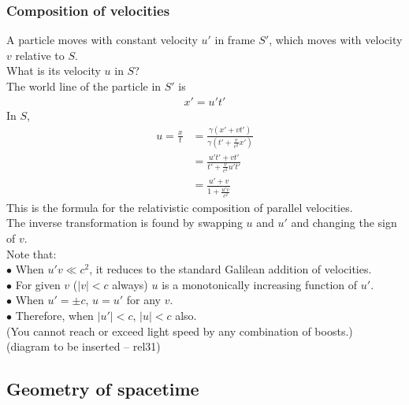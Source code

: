 \documentclass[a4paper]{article}
\begin{document}
\subsubsection{Composition of velocities}
A particle moves with constant velocity $u'$ in frame $S'$, which moves with velocity $v$ relative to $S$.\\
What is its velocity $u$ in $S$?\\
The world line of the particle in $S'$ is
\begin{equation*}
\begin{aligned}
x' = u't'
\end{aligned}
\end{equation*}
In $S$,
\begin{equation*}
\begin{aligned}
u=\frac{x}{t}&=\frac{\gamma\left(x'+vt'\right)}{\gamma\left(t'+\frac{v}{c^2}x'\right)}\\
&=\frac{u't'+vt'}{t'+\frac{v}{c^2}u't'}\\
&=\frac{u'+v}{1+\frac{u'v}{c^2}}
\end{aligned}
\end{equation*}
This is the formula for the relativistic composition of parallel velocities.\\
The inverse transformation is found by swapping $u$ and $u'$ and changing the sign of $v$.\\
Note that:\\
$\bullet$ When $u'v \ll c^2$, it reduces to the standard Galilean addition of velocities.\\
$\bullet$ For given $v$ ($|v|<c$ always) $u$ is a monotonically increasing function of $u'$.\\
$\bullet$ When $u'=\pm c$, $u=u'$ for any $v$.\\
$\bullet$ Therefore, when $|u'|<c$, $|u|<c$ also.\\
(You cannot reach or exceed light speed by any combination of boosts.)\\
(diagram to be inserted -- rel31)

\subsection{Geometry of spacetime}
\end{document}
